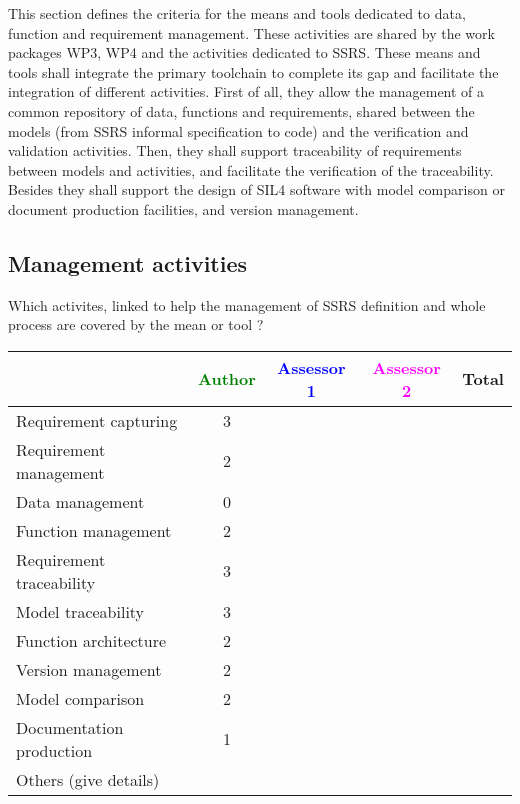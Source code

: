 This section defines the criteria for the means and tools dedicated to data, function and requirement management. These activities are shared by the work packages WP3, WP4 and the activities dedicated to  SSRS.
These means and tools shall integrate the primary toolchain to  complete its gap and facilitate the integration of different activities. First of all, they  allow the management of a common repository of data, functions and requirements, shared between the models (from SSRS informal specification to code) and the verification and validation activities.  
Then, they shall support traceability of requirements between models and activities, and facilitate the verification of the traceability.
Besides they shall support the design of SIL4 software with model comparison or document production facilities, and version management.

\subsection{Management activities}

Which activites, linked to help the management of SSRS definition and whole process are covered by the mean or tool  ?

\begin{tabular}{|l | c | c | c | c|}
\hline
& \textcolor{green}{Author} & \textcolor{blue}{Assessor 1} & \textcolor{magenta}{Assessor 2} & Total \\
\hline 
Requirement capturing & 3 & & &  \\
\hline
Requirement management  & 2 & & & \\
\hline
Data management & 0 & & & \\
\hline
Function management & 2 & & & \\
\hline
Requirement traceability  & 3 & & & \\
\hline
Model traceability & 3 & & & \\
\hline
Function architecture & 2 & & & \\
\hline
Version management & 2 & & & \\
\hline
Model comparison & 2 & & & \\
\hline
Documentation production & 1 & & & \\
\hline
Others (give details) & & & & \\
\hline
\end{tabular}

